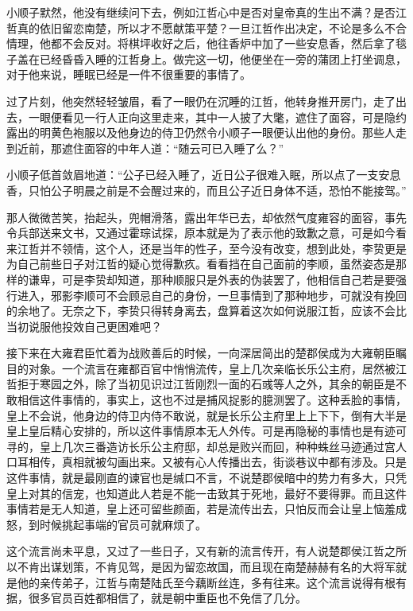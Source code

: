 小顺子默然，他没有继续问下去，例如江哲心中是否对皇帝真的生出不满？是否江哲真的依旧留恋南楚，所以才不愿献策平楚？一旦江哲作出决定，不论是多么不合情理，他都不会反对。将棋坪收好之后，他往香炉中加了一些安息香，然后拿了毯子盖在已经昏昏入睡的江哲身上。做完这一切，他便坐在一旁的蒲团上打坐调息，对于他来说，睡眠已经是一件不很重要的事情了。

过了片刻，他突然轻轻皱眉，看了一眼仍在沉睡的江哲，他转身推开房门，走了出去，一眼便看见一行人正向这里走来，其中一人披了大氅，遮住了面容，可是隐约露出的明黄色袍服以及他身边的侍卫仍然令小顺子一眼便认出他的身份。那些人走到近前，那遮住面容的中年人道：“随云可已入睡了么？”

小顺子低首敛眉地道：“公子已经入睡了，近日公子很难入眠，所以点了一支安息香，只怕公子明晨之前是不会醒过来的，而且公子近日身体不适，恐怕不能接驾。”

那人微微苦笑，抬起头，兜帽滑落，露出年华已去，却依然气度雍容的面容，事先令兵部送来文书，又通过霍琮试探，原本就是为了表示他的致歉之意，可是如今看来江哲并不领情，这个人，还是当年的性子，至今没有改变，想到此处，李贽更是为自己前些日子对江哲的疑心觉得歉疚。看看挡在自己面前的李顺，虽然姿态是那样的谦卑，可是李贽却知道，那种顺服只是外表的伪装罢了，他相信自己若是要强行进入，邪影李顺可不会顾忌自己的身份，一旦事情到了那种地步，可就没有挽回的余地了。无奈之下，李贽只得转身离去，盘算着这次如何说服江哲，应该不会比当初说服他投效自己更困难吧？

接下来在大雍君臣忙着为战败善后的时候，一向深居简出的楚郡侯成为大雍朝臣瞩目的对象。一个流言在雍都百官中悄悄流传，皇上几次亲临长乐公主府，居然被江哲拒于寒园之外，除了当初见识过江哲刚烈一面的石彧等人之外，其余的朝臣是不敢相信这件事情的，事实上，这也不过是捕风捉影的臆测罢了。这种丢脸的事情，皇上不会说，他身边的侍卫内侍不敢说，就是长乐公主府里上上下下，倒有大半是皇上皇后精心安排的，所以这件事情原本无人外传。可是再隐秘的事情也是有迹可寻的，皇上几次三番造访长乐公主府邸，却总是败兴而回，种种蛛丝马迹通过宫人口耳相传，真相就被勾画出来。又被有心人传播出去，街谈巷议中都有涉及。只是这件事情，就是最刚直的谏官也是缄口不言，不说楚郡侯暗中的势力有多大，只凭皇上对其的信宠，也知道此人若是不能一击致其于死地，最好不要得罪。而且这件事情若是无人知道，皇上还可留些颜面，若是流传出去，只怕反而会让皇上恼羞成怒，到时候挑起事端的官员可就麻烦了。

这个流言尚未平息，又过了一些日子，又有新的流言传开，有人说楚郡侯江哲之所以不肯出谋划策，不肯见驾，是因为留恋故国，而且现在南楚赫赫有名的大将军就是他的亲传弟子，江哲与南楚陆氏至今藕断丝连，多有往来。这个流言说得有根有据，很多官员百姓都相信了，就是朝中重臣也不免信了几分。

